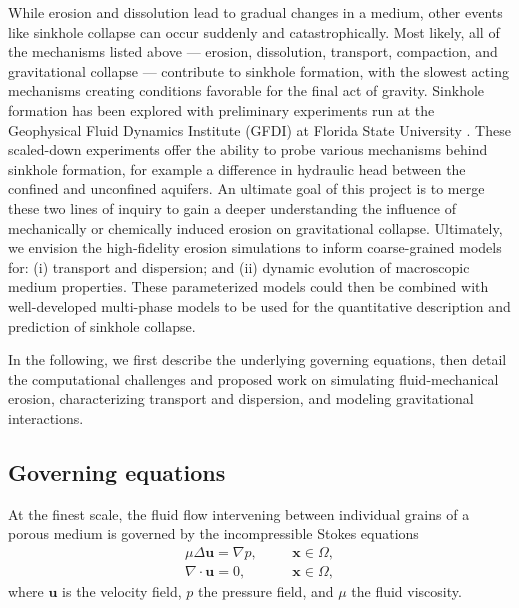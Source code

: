 \documentclass[11pt]{article}
\newcommand{\bvec}[1]{{\mathbf{#1}}}
\newcommand{\grad}{\nabla}
\newcommand{\uu}{\bvec{u}}
\newcommand{\xx}{\bvec{x}}
\begin{document}
While erosion and dissolution lead to gradual changes in a medium, other events like sinkhole collapse can occur suddenly and catastrophically. Most likely, all of the mechanisms listed above --- erosion, dissolution, transport, compaction, and gravitational collapse --- contribute to sinkhole formation, with the slowest acting mechanisms creating conditions favorable for the final act of gravity. Sinkhole formation has been explored with preliminary experiments run at the Geophysical Fluid Dynamics Institute (GFDI) at Florida State University \cite{tao2014experimental}. These scaled-down experiments offer the ability to probe various mechanisms behind sinkhole formation, for example a difference in hydraulic head between the confined and unconfined aquifers. An ultimate goal of this project is to merge these two lines of inquiry to gain a deeper understanding the influence of mechanically or chemically induced erosion on gravitational collapse. Ultimately, we envision the high-fidelity erosion simulations to inform coarse-grained models for: (i) transport and dispersion; and (ii) dynamic evolution of macroscopic medium properties. These parameterized models could then be combined with well-developed multi-phase models \cite{Imma2019, eastham2019multiphase} to be used for the quantitative description and prediction of sinkhole collapse.

	In the following, we first describe the underlying governing equations, then detail the computational challenges and proposed work on simulating fluid-mechanical erosion, characterizing transport and dispersion, and modeling gravitational interactions.


\subsection{Governing equations}
At the finest scale, the fluid flow intervening between individual grains of a porous medium is governed by the incompressible Stokes equations
\begin{equation}
\label{StokesEq}
\begin{split}
\mu \Delta \uu = \grad p,	&\hspace{20pt} \xx \in \Omega, \\
\grad \cdot \uu = 0, 		&\hspace{20pt} \xx \in \Omega,
\end{split}
\end{equation}
where $\uu$ is the velocity field, $p$ the pressure field, and $\mu$ the fluid viscosity. 
\end{document}
